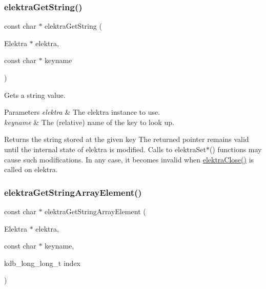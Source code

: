 \subsubsection{\texorpdfstring{elektra\+Get\+String()}{elektraGetString()}}
{\footnotesize\ttfamily const char $\ast$ elektra\+Get\+String (\begin{DoxyParamCaption}\item[{Elektra $\ast$}]{elektra,  }\item[{const char $\ast$}]{keyname }\end{DoxyParamCaption})}



Gets a string value. 


\begin{DoxyParams}{Parameters}
{\em elektra} & The elektra instance to use. \\
\hline
{\em keyname} & The (relative) name of the key to look up. \\
\hline
\end{DoxyParams}
\begin{DoxyReturn}{Returns}
the string stored at the given key The returned pointer remains valid until the internal state of {\ttfamily elektra} is modified. Calls to elektra\+Set$\ast$() functions may cause such modifications. In any case, it becomes invalid when \hyperlink{group__highlevel_ga9b688b7250e5f9d8ea6701cc2cc269af}{elektra\+Close()} is called on {\ttfamily elektra}. 
\end{DoxyReturn}
\mbox{\label{group__highlevel_gaf445216facccfc7ad6740b594e7a8f6e}} 
\subsubsection{\texorpdfstring{elektra\+Get\+String\+Array\+Element()}{elektraGetStringArrayElement()}}
{\footnotesize\ttfamily const char $\ast$ elektra\+Get\+String\+Array\+Element (\begin{DoxyParamCaption}\item[{Elektra $\ast$}]{elektra,  }\item[{const char $\ast$}]{keyname,  }\item[{kdb\+\_\+long\+\_\+long\+\_\+t}]{index }\end{DoxyParamCaption})}



